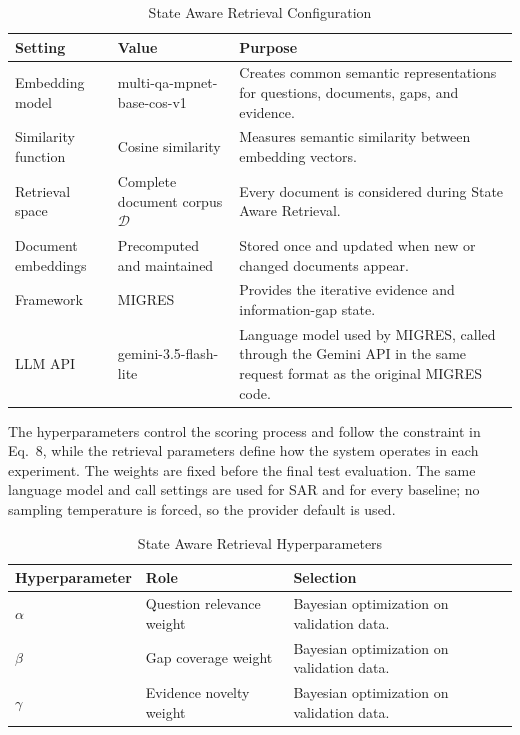 \documentclass[12pt,a4paper]{report}
\begin{document}
\begin{table}[H]
\centering
\caption{State Aware Retrieval Configuration}
\label{tab:sar-settings}
\renewcommand{\arraystretch}{1.2}
\begin{tabular}{|p{1.75in}|p{1.35in}|p{3.0in}|}
\hline
\textbf{Setting} & \textbf{Value} & \textbf{Purpose} \\ \hline
Embedding model & multi-qa-mpnet-\allowbreak base-cos-v1 & Creates common semantic representations for questions, documents, gaps, and evidence. \\ \hline
Similarity function & Cosine similarity & Measures semantic similarity between embedding vectors. \\ \hline
Retrieval space & Complete document corpus $\mathcal{D}$ & Every document is considered during State Aware Retrieval. \\ \hline
Document embeddings & Precomputed and maintained & Stored once and updated when new or changed documents appear. \\ \hline
Framework & MIGRES & Provides the iterative evidence and information-gap state. \\ \hline
LLM API & gemini-3.5-flash-lite & Language model used by MIGRES, called through the Gemini API in the same request format as the original MIGRES code. \\ \hline
\end{tabular}
\end{table}

The hyperparameters control the scoring process and follow the constraint in Eq.~8, while the retrieval parameters define how the system operates in each experiment. The weights are fixed before the final test evaluation. The same language model and call settings are used for SAR and for every baseline; no sampling temperature is forced, so the provider default is used.

\begin{table}[H]
\centering
\caption{State Aware Retrieval Hyperparameters}
\label{tab:sar-hyperparameters}
\renewcommand{\arraystretch}{1.2}
\begin{tabular}{|p{1.3in}|p{2.0in}|p{2.8in}|}
\hline
\textbf{Hyperparameter} & \textbf{Role} & \textbf{Selection} \\ \hline
$\alpha$ & Question relevance weight & Bayesian optimization on validation data. \\ \hline
$\beta$ & Gap coverage weight & Bayesian optimization on validation data. \\ \hline
$\gamma$ & Evidence novelty weight & Bayesian optimization on validation data. \\ \hline
\end{tabular}
\end{table}
\end{document}
